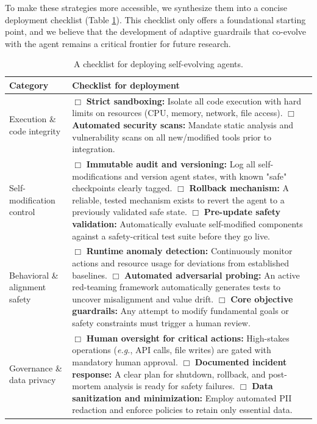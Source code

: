\documentclass{article} %
\begin{document}
{To make these strategies more accessible, we synthesize them into a concise deployment checklist (Table \ref{tab:compliance_checklist_rebuttal}). This checklist only offers a foundational starting point, and we believe that the development of adaptive guardrails that co-evolve with the agent remains a critical frontier for future research.

\begin{table}[t]
\centering
\caption{A checklist for deploying self-evolving agents.}
\vspace{-0.2cm}
\label{tab:compliance_checklist_rebuttal}
{
\small
\begin{tabularx}{\textwidth}{>{\raggedright\arraybackslash}p{3.2cm} X}
\toprule
\textbf{Category} & \textbf{Checklist for deployment} \\
\midrule
Execution \& code integrity
    & $\Box$ \textbf{Strict sandboxing:} Isolate all code execution with hard limits on resources (CPU, memory, network, file access). \newline
    $\Box$ \textbf{Automated security scans:} Mandate static analysis and vulnerability scans on all new/modified tools prior to integration. \\
\midrule
Self-modification control
    & $\Box$ \textbf{Immutable audit and versioning:} Log all self-modifications and version agent states, with known "safe" checkpoints clearly tagged. \newline
    $\Box$ \textbf{Rollback mechanism:} A reliable, tested mechanism exists to revert the agent to a previously validated safe state. \newline
    $\Box$ \textbf{Pre-update safety validation:} Automatically evaluate self-modified components against a safety-critical test suite before they go live. \\
\midrule
Behavioral \& alignment safety
    & $\Box$ \textbf{Runtime anomaly detection:} Continuously monitor actions and resource usage for deviations from established baselines. \newline
    $\Box$ \textbf{Automated adversarial probing:} An active red-teaming framework automatically generates tests to uncover misalignment and value drift. \newline
    $\Box$ \textbf{Core objective guardrails:} Any attempt to modify fundamental goals or safety constraints must trigger a human review. \\
\midrule
Governance \& data privacy
    & $\Box$ \textbf{Human oversight for critical actions:} High-stakes operations (\textit{e.g.}, API calls, file writes) are gated with mandatory human approval. \newline
    $\Box$ \textbf{Documented incident response:} A clear plan for shutdown, rollback, and post-mortem analysis is ready for safety failures. \newline
    $\Box$ \textbf{Data sanitization and minimization:} Employ automated PII redaction and enforce policies to retain only essential data. \\
\bottomrule
\end{tabularx}
}
\end{table}

}
\end{document}
